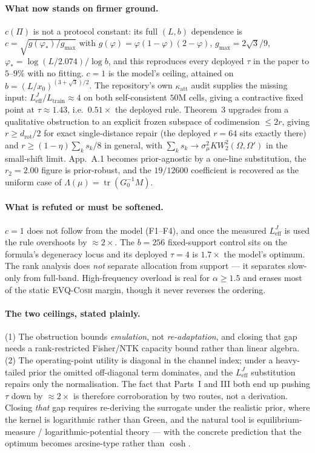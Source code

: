 \documentclass[11pt]{article}
\theoremstyle{definition}
\newcommand{\evq}{\textsc{EVQ-Cosh}}
\newcommand{\drot}{d_{\mathrm{rot}}}
\newcommand{\Ltr}{L_{\mathrm{train}}}
\newcommand{\Leff}{L_{\mathrm{eff}}^{J}}
\DeclareMathOperator{\tr}{tr}
\begin{document}
\paragraph{What now stands on firmer ground.}
$c(\Pi)$ is not a protocol constant: its full $(L,b)$ dependence is
$c=\sqrt{g(\varphi_*)/g_{\max}}$ with $g(\varphi)=\varphi(1-\varphi)(2-\varphi)$,
$g_{\max}=2\sqrt3/9$, $\varphi_*=\log(L/2.074)/\log b$, and this reproduces every deployed $\tau$
in the paper to $5$--$9\%$ with no fitting. $c=1$ is the model's ceiling, attained on
$b=(L/x_0)^{(3+\sqrt3)/2}$. The repository's own $\kappa_{\mathrm{att}}$ audit supplies the missing
input: $\Leff/\Ltr\approx4$ on both self-consistent $50$M cells, giving a contractive fixed point at
$\tau\approx1.43$, i.e.\ $0.51\times$ the deployed rule. Theorem~3 upgrades from a qualitative obstruction to an explicit
frozen subspace of codimension $\le2r$, giving $r\ge\drot/2$ for exact single-distance repair
(the deployed $r{=}64$ sits exactly there) and $r\ge(1-\eta)\sum_ks_k/8$ in general, with
$\sum_ks_k\to\sigma_\mu^2KW_2^2(\Omega,\Omega')$ in the small-shift limit. App.~A.1 becomes
prior-agnostic by a one-line substitution, the $r_2{=}2.00$ figure is prior-robust, and the
$19/12600$ coefficient is recovered as the uniform case of $\Lambda(\mu)=\tr(G_0^{-1}M)$.

\paragraph{What is refuted or must be softened.}
$c=1$ does not follow from the model (F1--F4), and once the measured $\Leff$ is used the rule
overshoots by $\approx2\times$. The $b{=}256$ fixed-support control sits on the
formula's degeneracy locus and its deployed $\tau{=}4$ is $1.7\times$ the model's optimum. The rank
analysis does \emph{not} separate allocation from support --- it separates slow-only from full-band.
High-frequency overload is real for $\alpha\ge1.5$ and erases most of the static \evq{} margin,
though it never reverses the ordering.

\paragraph{The two ceilings, stated plainly.}
(1) The obstruction bounds \emph{emulation}, not \emph{re-adaptation}, and closing that gap needs a
rank-restricted Fisher/NTK capacity bound rather than linear algebra.
(2) The operating-point utility is diagonal in the channel index; under a heavy-tailed prior the
omitted off-diagonal term dominates, and the $\Leff$ substitution repairs only the normalisation.
The fact that Parts~I and III both end up pushing $\tau$ down by $\approx2\times$ is therefore
corroboration by two routes, not a derivation. Closing \emph{that} gap requires re-deriving the
surrogate under the realistic prior,
where the kernel is logarithmic rather than Green, and the natural tool is equilibrium-measure /
logarithmic-potential theory --- with the concrete prediction that the optimum becomes arcsine-type
rather than $\cosh$.
\end{document}
